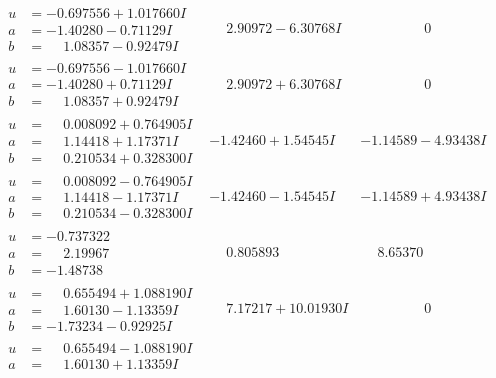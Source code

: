 \documentclass[1p]{elsarticle_modified}
\theoremstyle{definition}
\begin{document}
$$\begin{array}{c|c|c}
\begin{aligned}
u &= -0.697556 + 1.017660 I \\
a &= -1.40280 - 0.71129 I \\
b &= \phantom{-}1.08357 - 0.92479 I\end{aligned}
 & \phantom{-}2.90972 - 6.30768 I & \phantom{-0.000000 } 0 \\ \hline\begin{aligned}
u &= -0.697556 - 1.017660 I \\
a &= -1.40280 + 0.71129 I \\
b &= \phantom{-}1.08357 + 0.92479 I\end{aligned}
 & \phantom{-}2.90972 + 6.30768 I & \phantom{-0.000000 } 0 \\ \hline\begin{aligned}
u &= \phantom{-}0.008092 + 0.764905 I \\
a &= \phantom{-}1.14418 + 1.17371 I \\
b &= \phantom{-}0.210534 + 0.328300 I\end{aligned}
 & -1.42460 + 1.54545 I & -1.14589 - 4.93438 I \\ \hline\begin{aligned}
u &= \phantom{-}0.008092 - 0.764905 I \\
a &= \phantom{-}1.14418 - 1.17371 I \\
b &= \phantom{-}0.210534 - 0.328300 I\end{aligned}
 & -1.42460 - 1.54545 I & -1.14589 + 4.93438 I \\ \hline\begin{aligned}
u &= -0.737322\phantom{ +0.000000I} \\
a &= \phantom{-}2.19967\phantom{ +0.000000I} \\
b &= -1.48738\phantom{ +0.000000I}\end{aligned}
 & \phantom{-}0.805893\phantom{ +0.000000I} & \phantom{-}8.65370\phantom{ +0.000000I} \\ \hline\begin{aligned}
u &= \phantom{-}0.655494 + 1.088190 I \\
a &= \phantom{-}1.60130 - 1.13359 I \\
b &= -1.73234 - 0.92925 I\end{aligned}
 & \phantom{-}7.17217 + 10.01930 I & \phantom{-0.000000 } 0 \\ \hline\begin{aligned}
u &= \phantom{-}0.655494 - 1.088190 I \\
a &= \phantom{-}1.60130 + 1.13359 I \\

\end{aligned}
\end{array}$$
\end{document}
